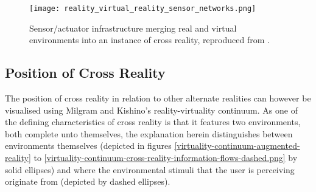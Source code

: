 \begin{figure}[h]
	\centering
	\texttt{[image: reality\_virtual\_reality\_sensor\_networks.png]}
	\caption{Sensor/actuator infrastructure merging real and virtual environments into an instance of cross reality, reproduced from \cite{Lifton2007a}.}
	\label{reality_virtual_reality_sensor_networks.png}
\end{figure}



\subsection{Position of Cross Reality}

\label{positionofcrossreality}

\newcommand{\avxrfootnote}{\footnote{This discussion over the relationship between augmented reality and cross reality also stands for the relationship between augmented virtuality and cross reality, however as augmented virtuality has received less attention in the literature and in commercially available implementations, the discussion uses augmented reality as its example.}}

The position of cross reality in relation to other alternate realities can however be visualised using Milgram and Kishino's reality-virtuality continuum. As one of the defining characteristics of cross reality is that it features two environments, both complete unto themselves, the explanation herein distinguishes between environments themselves (depicted in figures \ref{virtuality-continuum-augmented-reality} to \ref{virtuality-continuum-cross-reality-information-flows-dashed.png} by solid ellipses) and where the environmental stimuli that the user is perceiving originate from (depicted by dashed ellipses).


